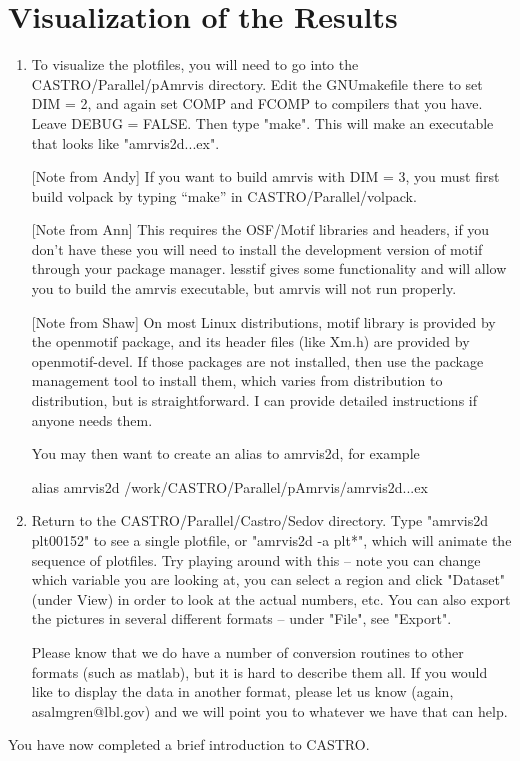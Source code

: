 \section{Visualization of the Results}

\begin{enumerate}

\item To visualize the plotfiles, you will need to go into the CASTRO/Parallel/pAmrvis 
directory. Edit the GNUmakefile there to set DIM = 2, and again set COMP and FCOMP to 
compilers that you have. Leave DEBUG = FALSE. Then type "make".  This will make an 
executable that looks like "amrvis2d...ex".

[Note from Andy] If you want to build amrvis with DIM = 3, you must first build volpack by 
typing ``make'' in CASTRO/Parallel/volpack.

[Note from Ann] This requires the OSF/Motif libraries and headers, if you don't have these 
you will need to install the development version of motif through your package manager. 
lesstif gives some functionality and will allow you to build the amrvis executable, 
but amrvis will not run properly.

[Note from Shaw] On most Linux distributions, motif library is provided by the openmotif package, 
and its header files (like Xm.h) are provided by openmotif-devel. If those packages are not 
installed, then use the package management tool to install them, which varies from distribution 
to distribution, but is straightforward. I can provide detailed instructions if anyone needs them.

You may then want to create an alias to amrvis2d, for example

alias amrvis2d /work/CASTRO/Parallel/pAmrvis/amrvis2d...ex

\item Return to the CASTRO/Parallel/Castro/Sedov directory. Type "amrvis2d plt00152" to see a single plotfile, or "amrvis2d -a plt*", which will animate the sequence of plotfiles. Try playing around with this -- note you can change which variable you are looking at, you can select a region and click "Dataset" (under View) in order to look at the actual numbers, etc. You can also export the pictures in several different formats -- under "File", see "Export".

Please know that we do have a number of conversion routines to other formats (such as matlab), but it is hard to describe them all. If you would like to display the data in another format, please let us know (again, asalmgren@lbl.gov) and we will point you to whatever we have that can help.

\end{enumerate}

You have now completed a brief introduction to CASTRO. 
